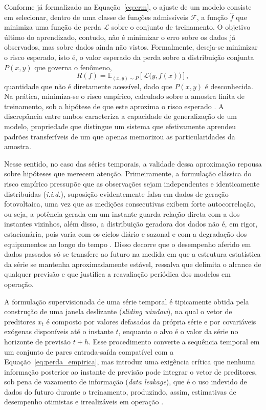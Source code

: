 Conforme já formalizado na Equação~\eqref{eq:erm}, o ajuste de um
modelo consiste em selecionar, dentro de uma classe de funções admissíveis
$\mathcal{F}$, a função $\hat{f}$ que minimiza uma função de perda
$\mathcal{L}$ sobre o conjunto de treinamento. O objetivo último do aprendizado,
contudo, não é minimizar o erro sobre os dados já observados, mas sobre dados
ainda não vistos. Formalmente, deseja-se minimizar o risco esperado, isto é, o
valor esperado da perda sobre a distribuição conjunta $P(x,y)$ que governa o
fenômeno,
%
\begin{equation}
    R(f) = \mathbb{E}_{(x,y)\sim P}\!\left[\mathcal{L}\big(y, f(x)\big)\right],
    \label{eq:risco_esperado}
\end{equation}
%
quantidade que não é diretamente acessível, dado que $P(x,y)$ é desconhecida. Na
prática, minimiza-se o risco empírico, calculado sobre a amostra finita de
treinamento, sob a hipótese de que este aproxima o risco esperado
\cite{vapnik1999}. A discrepância entre ambos caracteriza a capacidade de
generalização de um modelo, propriedade que distingue um sistema que
efetivamente aprendeu padrões transferíveis de um que apenas memorizou as
particularidades da amostra.

Nesse sentido, no caso das séries temporais, a validade dessa aproximação repousa sobre
hipóteses que merecem atenção. Primeiramente, a formulação clássica do risco empírico pressupõe
que as observações sejam independentes e identicamente distribuídas (\textit{i.i.d.}),
suposição evidentemente falsa em dados de geração fotovoltaica, uma vez que as medições
consecutivas exibem forte autocorrelação, ou seja, a potência gerada em um instante
guarda relação direta com a dos instantes vizinhos, além disso, a distribuição
geradora dos dados não é, em rigor, estacionária, pois varia com os ciclos
diário e sazonal e com a degradação dos equipamentos ao longo do tempo
\cite{hyndman2021}. Disso decorre que o desempenho aferido em dados passados só
se transfere ao futuro na medida em que a estrutura estatística da série se
mantenha aproximadamente estável, ressalva que delimita o alcance de qualquer
previsão e que justifica a reavaliação periódica dos modelos em operação.

A formulação supervisionada de uma série temporal é tipicamente obtida pela
construção de uma janela deslizante (\textit{sliding window}), na qual o vetor
de preditores $x_t$ é composto por valores defasados da própria série e por
covariáveis exógenas disponíveis até o instante $t$, enquanto o alvo é o valor
da série no horizonte de previsão $t+h$. Esse procedimento converte a sequência
temporal em um conjunto de pares entrada-saída compatível com a
Equação~\eqref{eq:perda_empirica}, mas introduz uma exigência crítica que nenhuma
informação posterior ao instante de previsão pode integrar o vetor de
preditores, sob pena de vazamento de informação (\textit{data leakage}), que é o uso indevido de dados do futuro durante o treinamento, produzindo, assim,
estimativas de desempenho otimistas e irrealizáveis em operação
\cite{hastie2009}.

